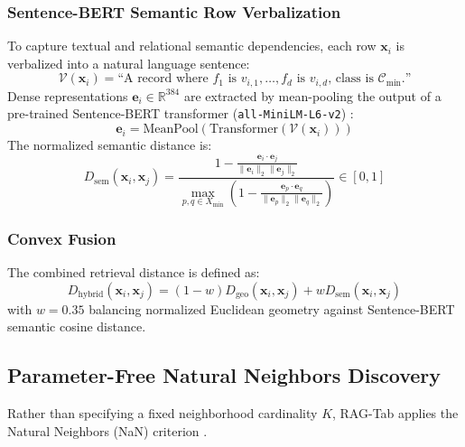 \documentclass[sn-basic]{sn-jnl}
\begin{document}
\subsubsection{Sentence-BERT Semantic Row Verbalization}
To capture textual and relational semantic dependencies, each row $\mathbf{x}_i$ is verbalized into a natural language sentence:
\begin{equation}
\label{eq:verbalization}
\mathcal{V}(\mathbf{x}_i) = \text{``A record where } f_1 \text{ is } v_{i,1}, \dots, f_d \text{ is } v_{i,d}\text{, class is } \mathcal{C}_{\min}\text{.''}
\end{equation}
Dense representations $\mathbf{e}_i \in \mathbb{R}^{384}$ are extracted by mean-pooling the output of a pre-trained Sentence-BERT transformer (\texttt{all-MiniLM-L6-v2}) \citep{reimers2019sentence}:
\begin{equation}
\label{eq:sbert_embedding}
\mathbf{e}_i = \text{MeanPool}\left( \text{Transformer}\left(\mathcal{V}(\mathbf{x}_i)\right) \right)
\end{equation}
The normalized semantic distance is:
\begin{equation}
\label{eq:sem_distance}
D_{\text{sem}}(\mathbf{x}_i, \mathbf{x}_j) = \frac{1 - \frac{\mathbf{e}_i \cdot \mathbf{e}_j}{\|\mathbf{e}_i\|_2 \|\mathbf{e}_j\|_2}}{\max_{p, q \in X_{\min}} \left( 1 - \frac{\mathbf{e}_p \cdot \mathbf{e}_q}{\|\mathbf{e}_p\|_2 \|\mathbf{e}_q\|_2} \right)} \in [0, 1]
\end{equation}

\subsubsection{Convex Fusion}
The combined retrieval distance is defined as:
\begin{equation}
\label{eq:hybrid_distance}
D_{\text{hybrid}}(\mathbf{x}_i, \mathbf{x}_j) = (1 - w) D_{\text{geo}}(\mathbf{x}_i, \mathbf{x}_j) + w D_{\text{sem}}(\mathbf{x}_i, \mathbf{x}_j)
\end{equation}
with $w = 0.35$ balancing normalized Euclidean geometry against Sentence-BERT semantic cosine distance.

\subsection{Parameter-Free Natural Neighbors Discovery}
\label{subsec:natural_neighbors}
Rather than specifying a fixed neighborhood cardinality $K$, RAG-Tab applies the Natural Neighbors (NaN) criterion \citep{huang2011natural}.
\end{document}
